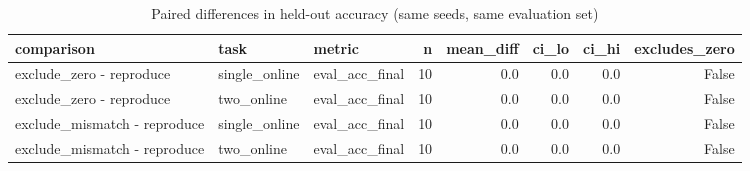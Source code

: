 \begin{table}[t]
\centering
\small
\begin{tabular}{lllrrrrr}
\toprule
comparison & task & metric & n & mean\_diff & ci\_lo & ci\_hi & excludes\_zero \\
\midrule
exclude\_zero - reproduce & single\_online & eval\_acc\_final & 10 & 0.0 & 0.0 & 0.0 & False \\
exclude\_zero - reproduce & two\_online & eval\_acc\_final & 10 & 0.0 & 0.0 & 0.0 & False \\
exclude\_mismatch - reproduce & single\_online & eval\_acc\_final & 10 & 0.0 & 0.0 & 0.0 & False \\
exclude\_mismatch - reproduce & two\_online & eval\_acc\_final & 10 & 0.0 & 0.0 & 0.0 & False \\
\bottomrule
\end{tabular}
\caption{Paired differences in held-out accuracy (same seeds, same evaluation set)}
\label{tab:kc_diag_paired}
\end{table}